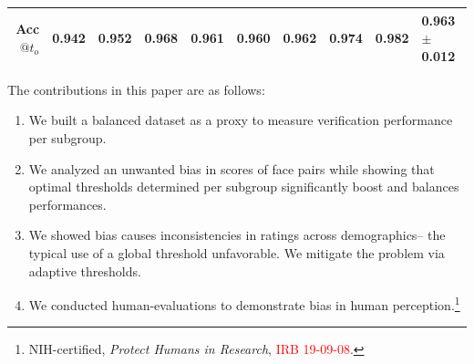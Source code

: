 \begin{table}[!t]
{{\begin{tabular}{r c c c c c c c c l}
        Acc$@t_o$ & 0.942 &0.952 &0.968 &0.961 &0.960 &0.962 & 0.974 &0.982 & 0.963 $\pm$ 0.012\\
        \bottomrule
    \end{tabular}}
    }
    \vspace{-12pt}
\end{table}




The contributions in this paper are as follows:
\begin{enumerate}
    \item We built a balanced dataset as a proxy to measure verification performance per subgroup.
    \item We analyzed an unwanted bias in scores of face pairs while showing that optimal thresholds determined per subgroup significantly boost and balances performances.
    \item We showed bias causes inconsistencies in ratings across demographics-- the typical use of a global threshold unfavorable. We mitigate the problem via adaptive thresholds.
    \item We conducted human-evaluations to demonstrate bias in human perception.\footnote{NIH-certified, \textit{Protect Humans in Research}, \textcolor{red}{IRB 19-09-08}.}
\end{enumerate}

